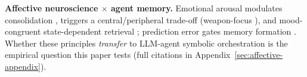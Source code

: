 \textbf{Affective neuroscience $\times$ agent memory.} Emotional arousal modulates consolidation \cite{mcgaugh2004}, triggers a central/peripheral trade-off (weapon-focus \cite{loftus1987}), and mood-congruent state-dependent retrieval \cite{bower1981}; prediction error gates memory formation \cite{ittibaldi2009}. Whether these principles \emph{transfer} to LLM-agent symbolic orchestration is the empirical question this paper tests (full citations in Appendix~\ref{sec:affective-appendix}).
